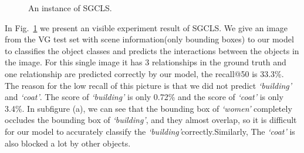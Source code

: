 \begin{figure}
{\begin{minipage}[t]{4.55cm}
	\end{minipage}}
	\caption[An instance of SGCLS]{An instance of SGCLS.}
	\label{fig:sgcls}
\end{figure}
In Fig.~\ref{fig:sgcls}  we present an visible experiment result of SGCLS. We give an image from the VG test set with scene information(only bounding boxes) to our  model to classifies the object classes and predicts the interactions between the objects in the image. For this single image it has 3 relationships in the ground truth and one relationship are predicted correctly by our model, the recall@50 is 33.3\%. The reason for the low recall of this picture is that we did not predict \textit{`building'} and \textit{`coat'}. The score of \textit{`building'} is only 0.72\% and the score of \textit{`coat'} is only 3.4\%. In subfigure (a), we can see that the bounding box of \textit{`women'} completely occludes the bounding box of \textit{`building'}, and they almost overlap, so it is difficult for our model to accurately classify the \textit{`building'}correctly.Similarly,
The \textit{`coat'} is also blocked a lot by other objects.
 
